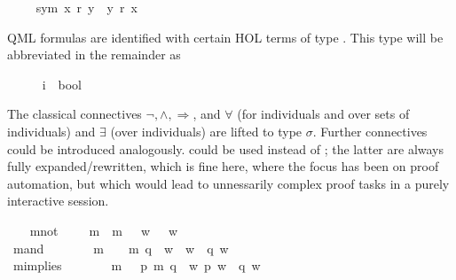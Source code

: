 \begin{isabellebody}
\isamarkuptrue%
\ \ \isamarkupfalse%
\ \ sym{\isacharcolon}\ {\isachardoublequoteopen}x\ r\ y\ {\isasymlongrightarrow}\ y\ r\ x{\isachardoublequoteclose}%
\begin{isamarkuptext}%
QML formulas are identified with certain HOL terms of type . 
This type will be abbreviated in the remainder as \isa{{\isasymsigma}}%
\end{isamarkuptext}%
\isamarkuptrue%
\ \ \isamarkupfalse%
\ {\isasymsigma}\ {\isacharequal}\ {\isachardoublequoteopen}{\isacharparenleft}i\ {\isasymRightarrow}\ bool{\isacharparenright}{\isachardoublequoteclose}%
\begin{isamarkuptext}%
The classical connectives $\neg, \wedge, \Rightarrow$, and $\forall$
(for individuals and over sets of individuals) and $\exists$ (over individuals) are
lifted to type $\sigma$. Further connectives could be introduced analogously.  
could be used instead of ; the latter are always fully expanded/rewritten,
which is fine here, where the focus has been on proof automation, but which would lead to 
unnessarily complex proof tasks in a purely interactive session.%
\end{isamarkuptext}%
\isamarkuptrue%
\ \ \isamarkupfalse%
\ mnot\ {\isacharcolon}{\isacharcolon}\ {\isachardoublequoteopen}{\isasymsigma}\ {\isasymRightarrow}\ {\isasymsigma}{\isachardoublequoteclose}\ {\isacharparenleft}{\isachardoublequoteopen}m{\isasymnot}{\isachardoublequoteclose}{\isacharparenright}\ \ {\isachardoublequoteopen}m{\isasymnot}\ {\isasymPhi}\ {\isasymequiv}\ {\isacharparenleft}{\isasymlambda}w{\isachardot}\ {\isasymnot}\ {\isasymPhi}\ w{\isacharparenright}{\isachardoublequoteclose}\ \ \ \ \isanewline
\ \ \isamarkupfalse%
\ mand\ {\isacharcolon}{\isacharcolon}\ {\isachardoublequoteopen}{\isasymsigma}\ {\isasymRightarrow}\ {\isasymsigma}\ {\isasymRightarrow}\ {\isasymsigma}{\isachardoublequoteclose}\ {\isacharparenleft}\ {\isachardoublequoteopen}m{\isasymand}{\isachardoublequoteclose}\ {}{}{\isacharparenright}\ \ {\isachardoublequoteopen}{\isasymPhi}\ m{\isasymand}\ q\ {\isasymequiv}\ {\isacharparenleft}{\isasymlambda}w{\isachardot}\ {\isasymPhi}\ w\ {\isasymand}\ q\ w{\isacharparenright}{\isachardoublequoteclose}\ \ \ \isanewline
\ \ \isamarkupfalse%
\ mimplies\ {\isacharcolon}{\isacharcolon}\ {\isachardoublequoteopen}{\isasymsigma}\ {\isasymRightarrow}\ {\isasymsigma}\ {\isasymRightarrow}\ {\isasymsigma}{\isachardoublequoteclose}\ {\isacharparenleft}\ {\isachardoublequoteopen}m{\isasymRightarrow}{\isachardoublequoteclose}\ {}{}{\isacharparenright}\ \ {\isachardoublequoteopen}p\ m{\isasymRightarrow}\ q\ {\isasymequiv}\ {\isacharparenleft}{\isasymlambda}w{\isachardot}\ p\ w\ {\isasymlongrightarrow}\ q\ w{\isacharparenright}{\isachardoublequoteclose}\ \ \isanewline

\end{isabellebody}
